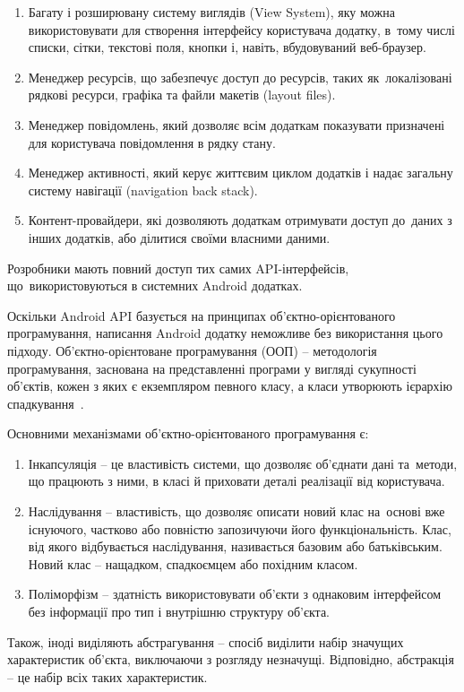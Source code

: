 \documentclass[../main.tex]{subfiles}
\begin{document}
\begin{enumerate}
	\item Багату і розширювану систему виглядів (View System), яку можна використовувати для створення інтерфейсу користувача додатку, в~тому числі списки, сітки, текстові поля, кнопки і, навіть, вбудовуваний веб-браузер.
	\item Менеджер ресурсів, що забезпечує доступ до ресурсів, таких як~локалізовані рядкові ресурси, графіка та файли макетів (layout files).
	\item Менеджер повідомлень, який дозволяє всім додаткам показувати призначені для користувача повідомлення в рядку стану.
	\item Менеджер активності, який керує життєвим циклом додатків і надає загальну систему навігації (navigation back stack).
	\item Контент-провайдери, які дозволяють додаткам отримувати доступ до~даних з інших додатків, або ділитися своїми власними даними.
\end{enumerate}

Розробники мають повний доступ тих самих API-інтерфейсів, що~використовуються в системних Android додатках.

Оскільки Android API базується на принципах об'єктно-орієнтованого програмування, написання Android додатку неможливе без використання цього підходу. Об'єктно-орієнтоване програмування (ООП) -- методологія програмування, заснована на представленні програми у вигляді сукупності об'єктів, кожен з яких є екземпляром певного класу, а класи утворюють ієрархію спадкування~\cite{oop}.

Основними механізмами об'єктно-орієнтованого програмування є:
\begin{enumerate}
	\item Інкапсуляція -- це властивість системи, що дозволяє об'єднати дані та~методи, що працюють з ними, в класі й приховати деталі реалізації від користувача.
	\item Наслідування -- властивість, що дозволяє описати новий клас на~основі вже існуючого, частково або повністю запозичуючи його функціональність. Клас, від якого відбувається наслідування, називається базовим або батьківським. Новий клас -- нащадком, спадкоємцем або похідним класом.
	\item Поліморфізм -- здатність використовувати об'єкти з однаковим інтерфейсом без інформації про тип і внутрішню структуру об'єкта.
\end{enumerate}

Також, іноді виділяють абстрагування -- спосіб виділити набір значущих характеристик об'єкта, виключаючи з розгляду незначущі. Відповідно, абстракція -- це набір всіх таких характеристик.
\end{document}
